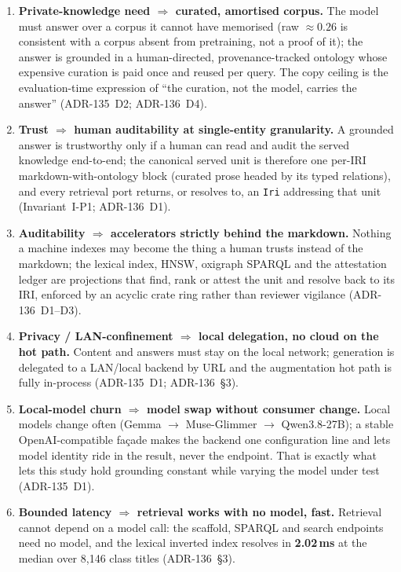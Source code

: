 \documentclass[10pt,twocolumn]{article}
\begin{document}
\begin{enumerate}[topsep=3pt,itemsep=2pt,leftmargin=1.5em]
\item \textbf{Private-knowledge need $\Rightarrow$ curated, amortised corpus.} The model must
answer over a corpus it cannot have memorised (raw $\approx0.26$ is consistent with a corpus absent
from pretraining, not a proof of it); the
answer is grounded in a human-directed, provenance-tracked ontology whose expensive curation is
paid once and reused per query. The copy ceiling is the evaluation-time expression of ``the
curation, not the model, carries the answer'' (ADR-135~D2; ADR-136~D4).
\item \textbf{Trust $\Rightarrow$ human auditability at single-entity granularity.} A grounded
answer is trustworthy only if a human can read and audit the served knowledge end-to-end; the
canonical served unit is therefore one per-IRI markdown-with-ontology block (curated prose headed
by its typed relations), and every retrieval port returns, or resolves to, an \texttt{Iri}
addressing that unit (Invariant~I-P1; ADR-136~D1).
\item \textbf{Auditability $\Rightarrow$ accelerators strictly behind the markdown.} Nothing a
machine indexes may become the thing a human trusts instead of the markdown; the lexical index,
HNSW, oxigraph SPARQL and the attestation ledger are projections that find, rank or attest the unit
and resolve back to its IRI, enforced by an acyclic crate ring rather than reviewer vigilance
(ADR-136~D1--D3).
\item \textbf{Privacy / LAN-confinement $\Rightarrow$ local delegation, no cloud on the hot path.}
Content and answers must stay on the local network; generation is delegated to a LAN/local backend
by URL and the augmentation hot path is fully in-process (ADR-135~D1; ADR-136~\S3).
\item \textbf{Local-model churn $\Rightarrow$ model swap without consumer change.} Local models
change often (Gemma $\to$ Muse-Glimmer $\to$ Qwen3.8-27B); a stable OpenAI-compatible façade makes
the backend one configuration line and lets model identity ride in the result, never the
endpoint. That is exactly what lets this study hold grounding constant while varying the model
under test (ADR-135~D1).
\item \textbf{Bounded latency $\Rightarrow$ retrieval works with no model, fast.} Retrieval cannot
depend on a model call: the scaffold, SPARQL and search endpoints need no model, and the lexical
inverted index resolves in \textbf{2.02\,ms} at the median over 8{,}146 class titles (ADR-136~\S3).

\end{enumerate}
\end{document}
